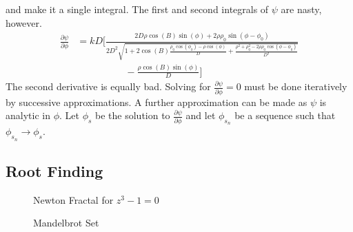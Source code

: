         and make it a single integral. The first and
        second integrals of $\psi$ are nasty, however.
        \begin{equation}
            \begin{split}
                \frac{\partial\psi}{\partial\phi}
                &=kD\Big[\frac{2D\rho\cos(B)
                    \sin(\phi)+2\rho\rho_{0}
                \sin(\phi-\phi_{0})}{2D^2\sqrt{1+2\cos(B)
                \frac{\rho_{0}\cos(\phi_{0})-\rho\cos(\phi)}{D}+
                \frac{\rho^{2}+\rho_{0}^{2}-
                2\rho\rho_{0}\cos(\phi-\phi_{0})}{D^2}}}\\
                &\quad\quad\quad\quad\quad
                -\frac{\rho\cos(B)\sin(\phi)}{D}\Big]
            \end{split}
        \end{equation}
        The second derivative is equally bad.
        Solving for $\frac{\partial\psi}{\partial\phi}=0$
        must be done iteratively by successive approximations.
        A further approximation can be made as $\psi$
        is analytic in $\phi$. Let $\phi_{s}$ be
        the solution to $\frac{\partial\psi}{\partial\phi}$
        and let $\phi_{s_{n}}$ be a sequence such that
        $\phi_{s_{n}}\rightarrow\phi_{s}$.
    \subsection{Root Finding}
        \begin{figure}[H]
            \centering
            \captionsetup{type=figure}
            \caption{Newton Fractal for $z^{3}-1=0$}
            \label{fig:Newton_Fractal}
        \end{figure}
        \begin{figure}[H]
            \centering
            \captionsetup{type=figure}
            \caption{Mandelbrot Set}
            \label{fig:Mandelbrot}
        \end{figure}
